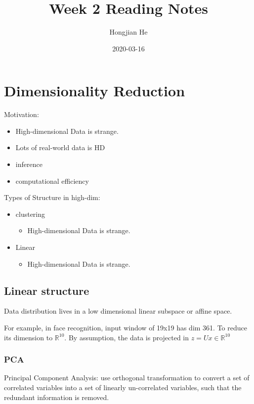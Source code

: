 \documentclass{article}
\title{Week 2 Reading Notes}
\date{2020-03-16}
\author{Hongjian He}
\begin{document}
  \maketitle
  \newpage

\section{Dimensionality Reduction}

Motivation: 

\begin{itemize}
\item High-dimensional Data is strange. 
\item Lots of real-world data is HD
\item inference
\item computational efficiency
\end{itemize}

Types of Structure in high-dim:

\begin{itemize}
\item clustering
\begin{itemize}
\item High-dimensional Data is strange. 
\end{itemize}
\item Linear
\begin{itemize}
\item High-dimensional Data is strange. 
\end{itemize}
\end{itemize}

\subsection{Linear structure}

Data distribution lives in a low dimensional linear subspace or affine space.

For example, in face recognition, input window of 19x19 has dim 361. To reduce
its dimension to $\mathbb{R}^10$. By assumption, the data is projected in $z=Ux\in\mathbb{R}^10$

\subsubsection{PCA}

Principal Component Analysis: use orthogonal transformation to convert 
a set of correlated variables into a set of linearly un-correlated variables,
such that the redundant information is removed.
\end{document}
